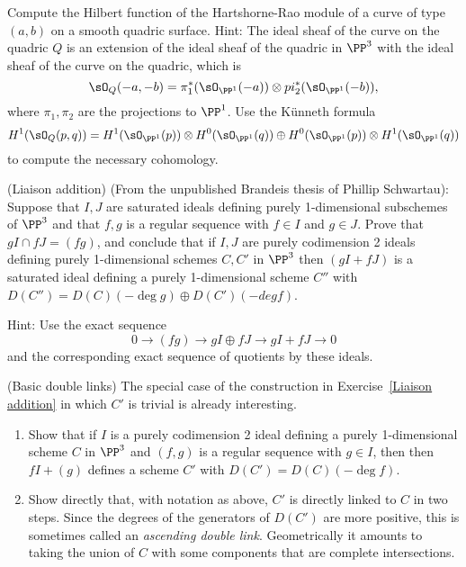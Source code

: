 \begin{exercise}
 Compute the Hilbert function of the Hartshorne-Rao module of a curve of type $(a,b)$ on a smooth quadric surface.
 Hint: The ideal sheaf of the curve on the quadric $Q$ is an extension of the ideal sheaf of the quadric in $\PP^3$
 with the ideal sheaf of the curve on the quadric, which is 
 $$
 \sO_Q(-a,-b) = \pi_1^*(\sO_{\PP^1}(-a)) \otimes pi_2^*(\sO_{\PP^1}(-b)),
 $$
 where $\pi_1, \pi_2$ are the projections to $\PP^1$. Use the K\"unneth formula
 $$
 H^1(\sO_Q(p,q)) = H^1(\sO_{\PP^1}(p)) \otimes H^0(\sO_{\PP^1}(q)) \oplus
  H^0(\sO_{\PP^1}(p)) \otimes H^1(\sO_{\PP^1}(q))
 $$
  to compute the necessary cohomology.
\end{exercise}

\begin{exercise} (Liaison addition)\label{Liaison addition}
(From the unpublished Brandeis thesis of Phillip Schwartau):
Suppose that $I, J$ are saturated ideals defining purely 1-dimensional subschemes of $\PP^3$
and that $f,g$ is a regular sequence with $f\in I$ and $g\in J$.
Prove that $g I \cap fJ = (fg)$, and conclude that if $I,J$ are purely codimension 2 ideals
 defining purely 1-dimensional schemes $C,C'$ in $\PP^3$
 then  $(gI+fJ)$ is a saturated ideal defining a purely 1-dimensional
scheme $C''$ with $D(C'') = D(C)(-\deg g) \oplus D(C')(-deg f)$.

Hint: Use the exact sequence 
$$
0\to (fg) \to gI \oplus fJ \to gI+fJ \to 0
$$
and the corresponding exact sequence of quotients by these ideals.
\end{exercise}


\begin{exercise}(Basic double links)\label{Basic double links}
The special case of the construction in Exercise~\ref{Liaison addition} in which $C'$ is trivial is already interesting. 

\begin{enumerate}
 \item Show that if $I$ is a purely codimension 2 ideal
 defining a purely 1-dimensional scheme $C$ in $\PP^3$
 and $(f, g)$ is a regular sequence with $g\in I$, then
 then  $fI+(g)$ defines a scheme $C'$ with $D(C') = D(C)(-\deg f)$.

 \item Show directly that, with notation as above, $C'$ is directly linked to $C$
 in two steps.  Since the degrees of the generators of $D(C')$ are more positive, this
 is sometimes called an \emph{ascending double link}. Geometrically it amounts to taking the
 union of $C$ with some  components that are complete intersections.
 \end{enumerate}

\end{exercise}

